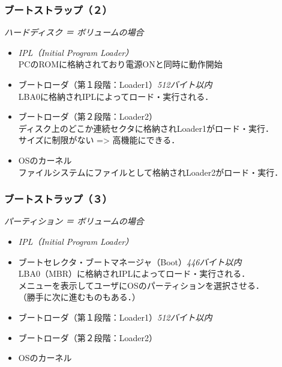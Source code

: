 \documentclass[unicode]{beamer}                   %
\begin{document}
\begin{frame}
  \frametitle{ブートストラップ（２）}
  \emph{ハードディスク ＝ ボリュームの場合}
  \begin{itemize}
  \item \emph{IPL（Initial Program Loader）} \\
    \small{PCのROMに格納されており電源ONと同時に動作開始}
  \item ブートローダ（第１段階：Loader1）\emph{512バイト以内} \\
    \small{LBA0に格納されIPLによってロード・実行される．}
  \item ブートローダ（第２段階：Loader2） \\
    \small{ディスク上のどこか連続セクタに格納されLoader1がロード・実行．\\
      サイズに制限がない => 高機能にできる．}
  \item OSのカーネル \\
    \small{ファイルシステムにファイルとして格納されLoader2がロード・実行．}
  \end{itemize}
\end{frame}

\begin{frame}
  \frametitle{ブートストラップ（３）}
  \emph{パーティション ＝ ボリュームの場合}
  \begin{itemize}
  \item \emph{IPL（Initial Program Loader）}
  \item ブートセレクタ・ブートマネージャ（Boot）\emph{446バイト以内} \\
    \small{LBA0（MBR）に格納されIPLによってロード・実行される．\\
    メニューを表示してユーザにOSのパーティションを選択させる．\\
    （勝手に次に進むものもある．）}
  \item ブートローダ（第１段階：Loader1）\emph{512バイト以内} 
  \item ブートローダ（第２段階：Loader2）
  \item OSのカーネル
  \end{itemize}
\end{frame}
\end{document}
